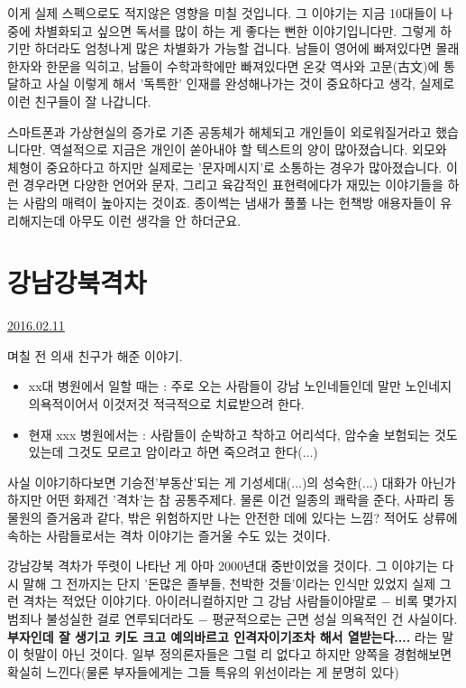 이게 실제 스펙으로도 적지않은 영향을 미칠 것입니다.
그 이야기는 지금 10대들이 나중에 차별화되고 싶으면 독서를 많이 하는 게 좋다는 뻔한 이야기입니다만.
그렇게 하기만 하더라도 엄청나게 많은 차별화가 가능할 겁니다.
남들이 영어에 빠져있다면 몰래 한자와 한문을 익히고,
남들이 수학과학에만 빠져있다면 온갖 역사와 고문(古文)에 통달하고
사실 이렇게 해서 '독특한' 인재를 완성해나가는 것이 중요하다고 생각, 실제로 이런 친구들이 잘 나갑니다.
\vspace{5mm}

스마트폰과 가상현실의 증가로 기존 공동체가 해체되고 개인들이 외로워질거라고 했습니다만.
역설적으로 지금은 개인이 쏟아내야 할 텍스트의 양이 많아졌습니다.
외모와 체형이 중요하다고 하지만 실제로는 '문자메시지'로 소통하는 경우가 많아졌습니다.
이런 경우라면 다양한 언어와 문자, 그리고 육감적인 표현력에다가 재밌는 이야기들을 하는 사람의 매력이 높아지는 것이죠.
종이썩는 냄새가 풀풀 나는 헌책방 애용자들이 유리해지는데 아무도 이런 생각을 안 하더군요.
\vspace{5mm}






\section{강남강북격차}
\href{https://www.kockoc.com/Apoc/631601}{2016.02.11}

\vspace{5mm}

며칠 전 의새 친구가 해준 이야기.
\vspace{5mm}
\begin{itemize}
    \item[] xx대 병원에서 일할 때는 : 주로 오는 사람들이 강남 노인네들인데 말만 노인네지 의욕적이어서 이것저것 적극적으로 치료받으려 한다.
    \item[] 현재 xxx 병원에서는        : 사람들이 순박하고 착하고 어리석다, 암수술 보험되는 것도 있는데 그것도 모르고 암이라고 하면 죽으려고 한다(...)
\end{itemize}
\vspace{5mm}

사실 이야기하다보면 기승전'부동산'되는 게 기성세대(...)의 성숙한(...) 대화가 아닌가 하지만
어떤 화제건 '격차'는 참 공통주제다.
물론 이건 일종의 쾌락을 준다, 사파리 동물원의 즐거움과 같다, 밖은 위험하지만 나는 안전한 데에 있다는 느낌?
적어도 상류에 속하는 사람들로서는 격차 이야기는 즐거울 수도 있는 것이다.
\vspace{5mm}

강남강북 격차가 뚜렷이 나타난 게 아마 2000년대 중반이었을 것이다.
그 이야기는 다시 말해 그 전까지는 단지 '돈많은 졸부들, 천박한 것들'이라는 인식만 있었지 실제 그런 격차는 적었단 이야기다.
아이러니컬하지만 그 강남 사람들이야말로 $-$ 비록 몇가지 범죄나 불성실한 걸로 연루되더라도 $-$ 평균적으로는 근면 성실 의욕적인 건 사실이다.
\textbf{부자인데 잘 생기고 키도 크고 예의바르고 인격자이기조차 해서 열받는다....} 라는 말이 헛말이 아닌 것이다.
일부 정의론자들은 그럴 리 없다고 하지만 양쪽을 경험해보면 확실히 느낀다(물론 부자들에게는 그들 특유의 위선이라는 게 분명히 있다)
\vspace{5mm}

